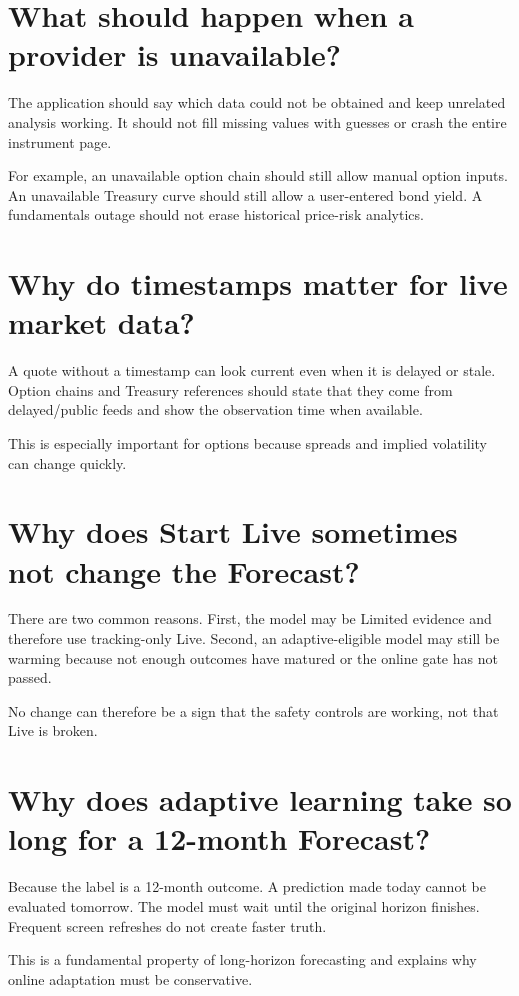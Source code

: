 \documentclass[11pt]{article}
\begin{document}
\section{What should happen when a provider is unavailable?}
The application should say which data could not be obtained and keep unrelated analysis working. It should not fill missing values with guesses or crash the entire instrument page.

For example, an unavailable option chain should still allow manual option inputs. An unavailable Treasury curve should still allow a user-entered bond yield. A fundamentals outage should not erase historical price-risk analytics.

\section{Why do timestamps matter for live market data?}
A quote without a timestamp can look current even when it is delayed or stale. Option chains and Treasury references should state that they come from delayed/public feeds and show the observation time when available.

This is especially important for options because spreads and implied volatility can change quickly.

\section{Why does Start Live sometimes not change the Forecast?}
There are two common reasons. First, the model may be Limited evidence and therefore use tracking-only Live. Second, an adaptive-eligible model may still be warming because not enough outcomes have matured or the online gate has not passed.

No change can therefore be a sign that the safety controls are working, not that Live is broken.

\section{Why does adaptive learning take so long for a 12-month Forecast?}
Because the label is a 12-month outcome. A prediction made today cannot be evaluated tomorrow. The model must wait until the original horizon finishes. Frequent screen refreshes do not create faster truth.

This is a fundamental property of long-horizon forecasting and explains why online adaptation must be conservative.
\end{document}
